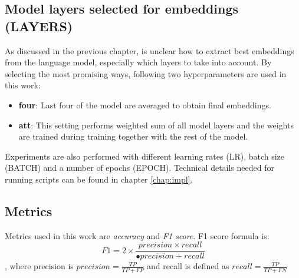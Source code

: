 \subsection{Model layers selected for embeddings (LAYERS)}
As discussed in the previous chapter, is unclear how to extract best embeddings from the language model, especially which layers to take into account. By selecting the most promising ways, following two hyperparameters are used in this work:
\begin{itemize}
\item \textbf{four}: Last four of the model are averaged to obtain final embeddings.
\item \textbf{att}: This setting performs weighted sum of all model layers and the weights are trained during training together with the rest of the model.
\end{itemize}
Experiments are also performed with different learning rates (LR), batch size (BATCH) and a number of epochs (EPOCH). 
Technical details needed for running scripts can be found in chapter \ref{chap:impl}.
\newpage

\newpage


\subsection{Metrics}
Metrics used in this work are \textit{accuracy} and \textit{F1 score}. 
F1 score formula is:
$$F1 = 2 \times \frac{precision \times recall}{•precision + recall}$$, where precision is $precision = \frac{TP}{TP + FP}$ and recall is defined as $recall = \frac{TP}{TP + FN}$
